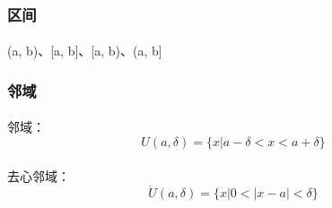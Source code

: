 \subsubsection{区间}
\paragraph{}
(a, b)、[a, b]、[a, b)、(a, b]
\subsubsection{邻域}

\paragraph{}
邻域：
\begin{equation}
U(a, \delta) = \{x | a - \delta < x < a + \delta\}
\end{equation}

\paragraph{}
去心邻域：
\begin{equation}
\mathring{U}(a, \delta) = \{x | 0 < |x - a| < \delta\}
\end{equation}
